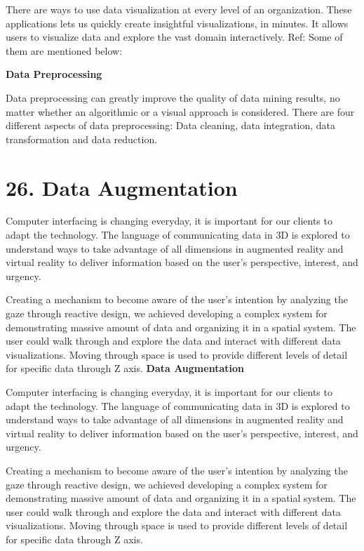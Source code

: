 \documentclass[]{book}
\theoremstyle{definition}
\theoremstyle{definition}
\theoremstyle{definition}
\theoremstyle{remark}
\begin{document}
There are ways to use data visualization at every level of an
organization. These applications lets us quickly create insightful
visualizations, in minutes. It allows users to visualize data and
explore the vast domain interactively. Ref: \citep{app1} Some of them
are mentioned below:

\textbf{Data Preprocessing}

Data preprocessing can greatly improve the quality of data mining
results, no matter whether an algorithmic or a visual approach is
considered. There are four different aspects of data preprocessing: Data
cleaning, data integration, data transformation and data reduction.

\section{26. Data Augmentation}\label{data-augmentation}

\citep{ref_pdf_ar}

Computer interfacing is changing everyday, it is important for our
clients to adapt the technology. The language of communicating data in
3D is explored to understand ways to take advantage of all dimensions in
augmented reality and virtual reality to deliver information based on
the user's perspective, interest, and urgency.

Creating a mechanism to become aware of the user's intention by
analyzing the gaze through reactive design, we achieved developing a
complex system for demonstrating massive amount of data and organizing
it in a spatial system. The user could walk through and explore the data
and interact with different data visualizations. Moving through space is
used to provide different levels of detail for specific data through Z
axis. \textbf{Data Augmentation} \citep{outliar}

Computer interfacing is changing everyday, it is important for our
clients to adapt the technology. The language of communicating data in
3D is explored to understand ways to take advantage of all dimensions in
augmented reality and virtual reality to deliver information based on
the user's perspective, interest, and urgency.

Creating a mechanism to become aware of the user's intention by
analyzing the gaze through reactive design, we achieved developing a
complex system for demonstrating massive amount of data and organizing
it in a spatial system. The user could walk through and explore the data
and interact with different data visualizations. Moving through space is
used to provide different levels of detail for specific data through Z
axis.
\end{document}
